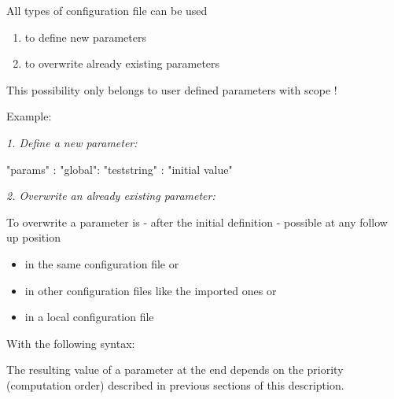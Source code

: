 All types of configuration file can be used

\begin{enumerate}
   \item to define new parameters
   \item to overwrite already existing parameters
\end{enumerate}

This possibility only belongs to user defined parameters with scope !

\vspace{2ex}

Example:

\textit{1. Define a new parameter:}

\begin{pythoncode}
"params" : {
            "global": {
                       "teststring" : "initial value"
                      }
           }
\end{pythoncode}

\vspace{2ex}

\textit{2. Overwrite an already existing parameter:}

To overwrite a parameter is - after the initial definition - possible at any follow up position

\begin{itemize}
   \item in the same configuration file or
   \item in other configuration files like the imported ones or
   \item in a local configuration file
\end{itemize}

With the following syntax:


The resulting value of a parameter at the end depends on the priority (computation order) described in previous sections of this description.


